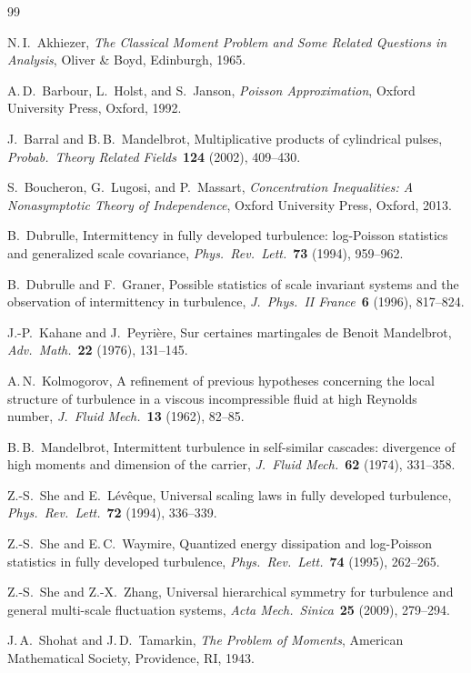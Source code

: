 \documentclass[12pt]{amsart}
\theoremstyle{definition}
\theoremstyle{remark}
\begin{document}
\begin{thebibliography}{99}

N.\,I.\ Akhiezer,
\textit{The Classical Moment Problem and Some Related Questions in
Analysis},
Oliver \& Boyd, Edinburgh, 1965.

A.\,D.\ Barbour, L.\ Holst, and S.\ Janson,
\textit{Poisson Approximation},
Oxford University Press, Oxford, 1992.

J.\ Barral and B.\,B.\ Mandelbrot,
Multiplicative products of cylindrical pulses,
\textit{Probab.\ Theory Related Fields}\ \textbf{124} (2002),
409--430.

S.\ Boucheron, G.\ Lugosi, and P.\ Massart,
\textit{Concentration Inequalities: A Nonasymptotic Theory of
Independence},
Oxford University Press, Oxford, 2013.

B.\ Dubrulle,
Intermittency in fully developed turbulence: log-Poisson statistics
and generalized scale covariance,
\textit{Phys.\ Rev.\ Lett.}\ \textbf{73} (1994), 959--962.

B.\ Dubrulle and F.\ Graner,
Possible statistics of scale invariant systems and the observation of
intermittency in turbulence,
\textit{J.\ Phys.\ II France}\ \textbf{6} (1996), 817--824.

J.-P.\ Kahane and J.\ Peyri\`ere,
Sur certaines martingales de Benoit Mandelbrot,
\textit{Adv.\ Math.}\ \textbf{22} (1976), 131--145.

A.\,N.\ Kolmogorov,
A refinement of previous hypotheses concerning the local structure of
turbulence in a viscous incompressible fluid at high Reynolds number,
\textit{J.\ Fluid Mech.}\ \textbf{13} (1962), 82--85.

B.\,B.\ Mandelbrot,
Intermittent turbulence in self-similar cascades: divergence of high
moments and dimension of the carrier,
\textit{J.\ Fluid Mech.}\ \textbf{62} (1974), 331--358.

Z.-S.\ She and E.\ L\'ev\^eque,
Universal scaling laws in fully developed turbulence,
\textit{Phys.\ Rev.\ Lett.}\ \textbf{72} (1994), 336--339.

Z.-S.\ She and E.\,C.\ Waymire,
Quantized energy dissipation and log-Poisson statistics in fully
developed turbulence,
\textit{Phys.\ Rev.\ Lett.}\ \textbf{74} (1995), 262--265.

Z.-S.\ She and Z.-X.\ Zhang,
Universal hierarchical symmetry for turbulence and general multi-scale
fluctuation systems,
\textit{Acta Mech.\ Sinica}\ \textbf{25} (2009), 279--294.

J.\,A.\ Shohat and J.\,D.\ Tamarkin,
\textit{The Problem of Moments},
American Mathematical Society, Providence, RI, 1943.

\end{thebibliography}
\end{document}
